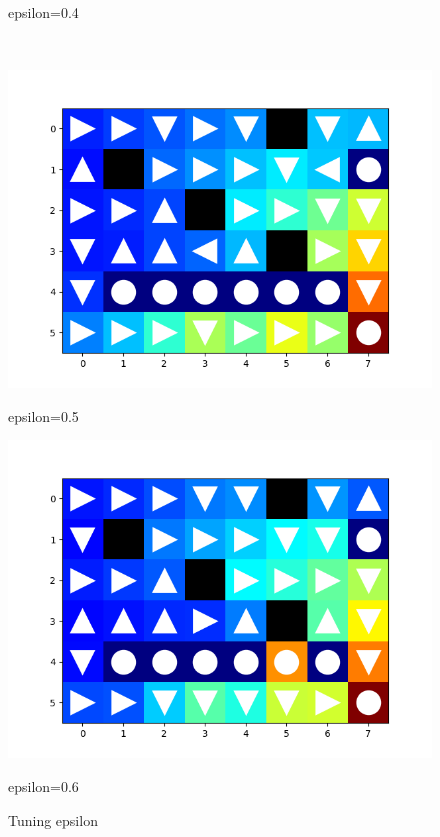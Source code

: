 \documentclass[aps,letterpaper,10pt]{revtex4}
\begin{document}
\begin{enumerate}
\begin{figure}[htbp]
\begin{minipage}[t]{0.5\linewidth}
            \caption{epsilon=0.4} 
            \end{minipage}
            \\
            \centering 
            \begin{minipage}[t]{0.5\linewidth}
            \centering 
            \includegraphics[scale=0.5]{e=5.png} 
            \caption{epsilon=0.5} 
            \end{minipage}%
            \begin{minipage}[t]{0.5\linewidth} 
            \centering 
            \includegraphics[scale=0.5]{e=6.png} 
            \caption{epsilon=0.6} 
            \end{minipage}
            \centering 
            \caption{Tuning epsilon} 
        \end{figure}
        \newpage
    \end{enumerate}
\end{document}

